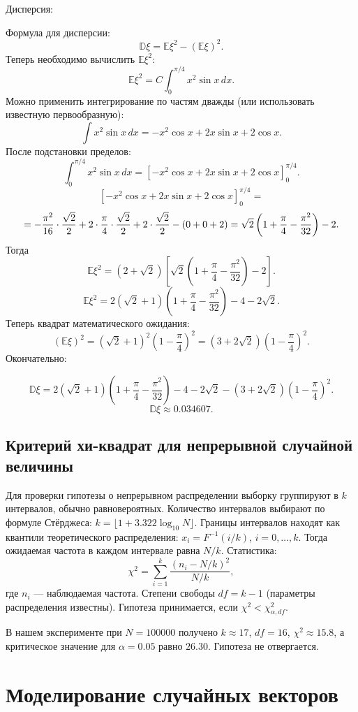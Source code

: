 \documentclass[bachelor, och, pract3]{SCWorks}
\begin{document}
Дисперсия:

Формула для дисперсии:
\[
\mathbb D\xi=\mathbb E\xi^2-(\mathbb E\xi)^2.
\]
Теперь необходимо вычислить \(\mathbb E\xi^2\):
\[
\mathbb E\xi^2=C\int_0^{\pi/4} x^2\sin x\,dx.
\]
Можно применить интегрирование по частям дважды (или использовать известную первообразную):
\[
\int x^2\sin x\,dx = -x^2\cos x+2x\sin x+2\cos x.
\]
После подстановки пределов:
\[
\int_0^{\pi/4} x^2\sin x\,dx
= \left[-x^2\cos x+2x\sin x+2\cos x\right]_0^{\pi/4}.
\]
\[
\left[-x^2\cos x+2x\sin x+2\cos x\right]_0^{\pi/4} =
\]
\[
= -\frac{\pi^2}{16}\cdot\frac{\sqrt2}{2}
+2\cdot\frac{\pi}{4}\cdot\frac{\sqrt2}{2}
+2\cdot\frac{\sqrt2}{2} - (0+0+2) \\
= \sqrt2\left(1+\frac{\pi}{4}-\frac{\pi^2}{32}\right)-2.
\]
Тогда
\[
\mathbb E\xi^2=(2+\sqrt2)\left[\sqrt2\left(1+\frac{\pi}{4}-\frac{\pi^2}{32}\right)-2\right].
\]
\[
\mathbb E\xi^2
=2(\sqrt2+1)\left(1+\frac{\pi}{4}-\frac{\pi^2}{32}\right)-4-2\sqrt2.
\]
Теперь квадрат математического ожидания:
\[
(\mathbb E\xi)^2=(\sqrt2+1)^2\left(1-\frac{\pi}{4}\right)^2
= (3+2\sqrt2)\left(1-\frac{\pi}{4}\right)^2.
\]
Окончательно:

\[
\mathbb D\xi
=2(\sqrt2+1)\left(1+\frac{\pi}{4}-\frac{\pi^2}{32}\right)-4-2\sqrt2-(3+2\sqrt2)\left(1-\frac{\pi}{4}\right)^2
.
\]
\[
\mathbb D\xi \approx 0.034607.
\]

\subsection{Критерий хи-квадрат для непрерывной случайной величины}

Для проверки гипотезы о непрерывном распределении выборку группируют в $k$ интервалов, обычно равновероятных. Количество интервалов выбирают по формуле Стёрджеса: $k = \lfloor 1 + 3.322\log_{10} N \rfloor$. Границы интервалов находят как квантили теоретического распределения: $x_i = F^{-1}(i/k)$, $i=0,\dots,k$. Тогда ожидаемая частота в каждом интервале равна $N/k$. Статистика:
\[
\chi^2 = \sum_{i=1}^{k} \frac{(n_i - N/k)^2}{N/k},
\]
где $n_i$ — наблюдаемая частота. Степени свободы $df = k-1$ (параметры распределения известны). Гипотеза принимается, если $\chi^2 < \chi^2_{\alpha, df}$.

В нашем эксперименте при $N=100000$ получено $k\approx 17$, $df=16$, $\chi^2 \approx 15.8$, а критическое значение для $\alpha=0.05$ равно $26.30$. Гипотеза не отвергается.



\section{Моделирование случайных векторов}
\end{document}
